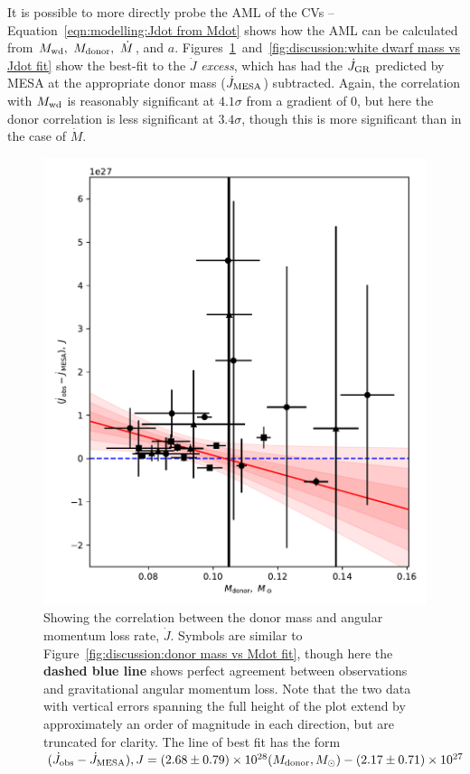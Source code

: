It is possible to more directly probe the AML of the CVs -- Equation~\ref{eqn:modelling:Jdot from Mdot} shows how the AML can be calculated from $M_{\rm wd},\ M_{\rm donor},\ \dot M$, and $a$.
Figures~\ref{fig:discussion:donor mass vs Jdot fit}~and~\ref{fig:discussion:white dwarf mass vs Jdot fit} show the best-fit to the $\dot J$ \textit{excess}, which has had the $\dot J_{\rm GR}$ predicted by MESA at the appropriate donor mass ($\dot J_{\rm MESA}$) subtracted.
Again, the correlation with $M_{\rm wd}$ is reasonably significant at $4.1\sigma$ from a gradient of 0, but here the donor correlation is less significant at $3.4\sigma$, though this is more significant than in the case of $\dot M$.
\begin{figure}
    \centering
    \includegraphics[width=\textwidth]{figures/results/Mdot/Mr_Jdot_ex.pdf}
    \caption{Showing the correlation between the donor mass and angular momentum loss rate, $\dot J$. Symbols are similar to Figure~\ref{fig:discussion:donor mass vs Mdot fit}, though here the {\bf dashed blue line} shows perfect agreement between observations and gravitational angular momentum loss. Note that the two data with vertical errors spanning the full height of the plot extend by approximately an order of magnitude in each direction, but are truncated for clarity. The line of best fit has the form $(\dot J_{\rm obs} - \dot J_{\rm MESA}), J = (2.68\pm0.79) \times 10^{28}(M_{\rm donor}, M_\odot) - (2.17\pm0.71)\times10^{27}$}
    \label{fig:discussion:donor mass vs Jdot fit}
\end{figure}
